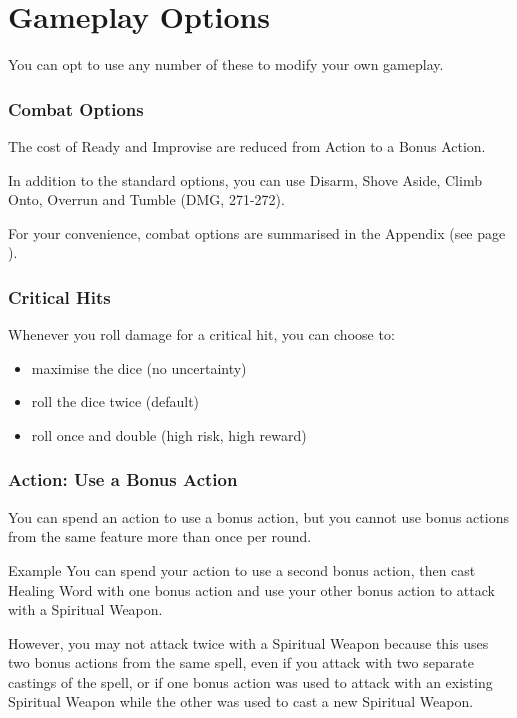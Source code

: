 \documentclass[letterpaper,twocolumn,openany,nodeprecatedcode,bg=print]{dndbook}
\newcommand{\pg}[1]{page \pageref{#1}}
\newcommand{\see}[1]{(see \pg{#1})}
\begin{document}
\chapter{Gameplay Options}
\noindent You can opt to use any number of these to modify your own gameplay.

\subsection{Combat Options}
The cost of Ready and Improvise are reduced from Action to a Bonus Action.

In addition to the standard options, you can use Disarm, Shove Aside, Climb Onto, Overrun and Tumble (DMG, 271-272). 

For your convenience, combat options are summarised in the Appendix \see{combat-options}.

\subsection{Critical Hits}
\label{critical-hit}
Whenever you roll damage for a critical hit, you can choose to:
\begin{itemize}
\item maximise the dice (no uncertainty)
\item roll the dice twice (default)
\item roll once and double (high risk, high reward)
\end{itemize}

\subsection{Action: Use a Bonus Action}
\label{gameplay-bonus-action}
You can spend an action to use a bonus action, 
but you cannot use bonus actions from the same feature more than once per round.

\begin{DndComment}{Example}
You can spend your action to use a second bonus action, 
then cast Healing Word with one bonus action 
and use your other bonus action to attack with a Spiritual Weapon. 

However, you may not attack twice with a Spiritual Weapon because this uses two bonus actions from the same spell, 
even if you attack with two separate castings of the spell, 
or if one bonus action was used to attack with an existing Spiritual Weapon while the other was used to cast a new Spiritual Weapon.
\end{DndComment}
\end{document}
